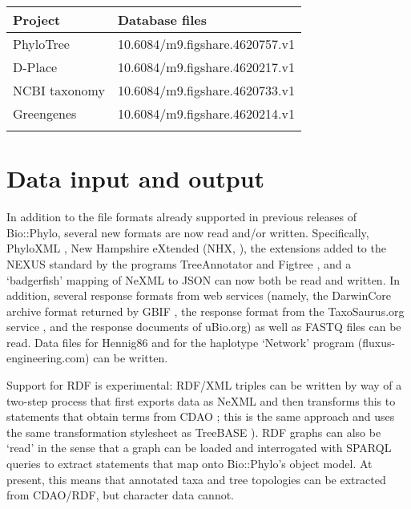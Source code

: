 \documentclass{bioinfo}
\begin{document}
\begin{table}[!t]
{\begin{tabular}{@{}ll@{}}\toprule \textbf{Project} & \textbf{Database files}\\\midrule
PhyloTree \citep{Oven2009}         & {\small 10.6084/m9.figshare.4620757.v1} \\
D-Place \citep{Kirby2016}          & {\small 10.6084/m9.figshare.4620217.v1} \\
NCBI taxonomy \citep{Federhen2011} & {\small 10.6084/m9.figshare.4620733.v1} \\
Greengenes \citep{Desantis2006}    & {\small 10.6084/m9.figshare.4620214.v1} \\\botrule
\end{tabular}}{}
\end{table}


\section{Data input and output}

In addition to the file formats already supported in previous releases of Bio::Phylo, 
several new formats are now read and/or written. Specifically, PhyloXML \citep{Han2009},
New Hampshire eXtended (NHX, \citet{Zmasek2001}), the extensions added to the NEXUS
standard by the programs TreeAnnotator and Figtree \citep{Rambaut2007}, and a `badgerfish'
mapping of NeXML \citep{Vos2012} to JSON can now both be read and written. In addition, 
several response formats from web services (namely, the DarwinCore archive format returned 
by GBIF \citep{Baker2014}, the response format from the TaxoSaurus.org service 
\citep{Stoltzfus2013}, and the response documents of uBio.org) as well as FASTQ 
\citep{Cock2009} files can be read. Data files for Hennig86 \citep{Farris1988} and for
the haplotype `Network' program (fluxus-engineering.com) can be written. 

Support for RDF is experimental: RDF/XML triples can be written by way of a two-step 
process that first exports data as NeXML and then transforms this to statements that 
obtain terms from CDAO \citep{Prosdocimi2009}; this is the same approach and uses the 
same transformation stylesheet as TreeBASE \citep{Piel2009}). RDF graphs can also be 
`read' in the sense that a graph can be loaded and interrogated with SPARQL queries to 
extract statements that map onto Bio::Phylo's object model. At present, this means that 
annotated taxa and tree topologies can be extracted from CDAO/RDF, but character data 
cannot.
\end{document}
